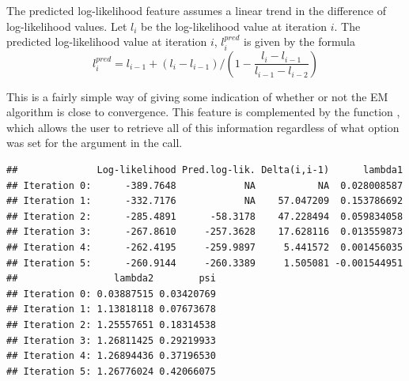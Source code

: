 \begin{enumerate}
The predicted log-likelihood feature assumes a linear trend in the difference of log-likelihood values. Let $l_i$ be the log-likelihood value at iteration $i$. The predicted log-likelihood value at iteration $i$, $l_i^{pred}$ is given by the formula
\[
  l_i^{pred} = l_{i-1} + (l_i - l_{i-1}) \Bigg/ \left( 1 - \frac{l_i - l_{i-1}}{l_{i-1} - l_{i-2}} \right)
\]

This is a fairly simple way of giving some indication of whether or not the EM algorithm is close to convergence. This feature is complemented by the function , which allows the user to retrieve all of this information regardless of what option was set for the  argument in the  call.

\begin{knitrout}
\color{fgcolor}\begin{kframe}
\begin{alltt}
 \hlkwb{<-}  \hlopt{~}   
                   \hlstd{=} \hlstd{(} \hlstd{=} \hlstd{))}
\end{alltt}
\end{kframe}
\end{knitrout}
\begin{knitrout}
\color{fgcolor}\begin{kframe}
\begin{alltt}
 \hlkwb{<-} \hlopt{::} \hlstd{)}
\end{alltt}
\begin{verbatim}
##              Log-likelihood Pred.log-lik. Delta(i,i-1)      lambda1
## Iteration 0:      -389.7648            NA           NA  0.028008587
## Iteration 1:      -332.7176            NA    57.047209  0.153786692
## Iteration 2:      -285.4891      -58.3178    47.228494  0.059834058
## Iteration 3:      -267.8610     -257.3628    17.628116  0.013559873
## Iteration 4:      -262.4195     -259.9897     5.441572  0.001456035
## Iteration 5:      -260.9144     -260.3389     1.505081 -0.001544951
##                 lambda2        psi
## Iteration 0: 0.03887515 0.03420769
## Iteration 1: 1.13818118 0.07673678
## Iteration 2: 1.25557651 0.18314538
## Iteration 3: 1.26811425 0.29219933
## Iteration 4: 1.26894436 0.37196530
## Iteration 5: 1.26776024 0.42066075
\end{verbatim}
\end{kframe}
\end{knitrout}


\end{enumerate}
